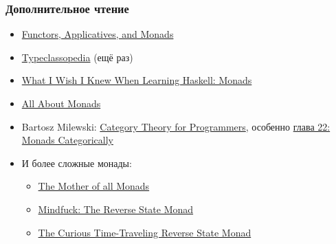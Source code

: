 \documentclass[11pt]{beamer}
\begin{document}
\begin{frame}[fragile]
  \frametitle{Дополнительное чтение}
  \begin{itemize}
    \item \href{https://www.snoyman.com/blog/2017/01/functors-applicatives-and-monads}{Functors, Applicatives, and Monads}
    \item \href{https://wiki.haskell.org/Typeclassopedia}{Typeclassopedia} (ещё раз)
    \item \href{https://smunix.github.io/dev.stephendiehl.com/hask/index.html#monads}{What I Wish I Knew When Learning Haskell: Monads}
    \item \href{https://wiki.haskell.org/All_About_Monads}{All About Monads}
    \item Bartosz Milewski: \href{https://bartoszmilewski.com/2014/10/28/category-theory-for-programmers-the-preface/}{Category Theory for Programmers}, особенно \href{https://bartoszmilewski.com/2016/12/27/monads-categorically/}{глава 22: Monads Categorically}
    \item И более сложные монады:
          \begin{itemize}
            \item \href{http://blog.sigfpe.com/2008/12/mother-of-all-monads.html}{The Mother of all Monads}
            \item \href{https://lukepalmer.wordpress.com/2008/08/10/mindfuck-the-reverse-state-monad/}{Mindfuck: The Reverse State Monad}
            \item \href{https://web.archive.org/web/2024/https://tech-blog.capital-match.com/posts/5-the-reverse-state-monad.html}{The Curious Time-Traveling Reverse State Monad}
          \end{itemize}
  \end{itemize}
\end{frame}
\end{document}
